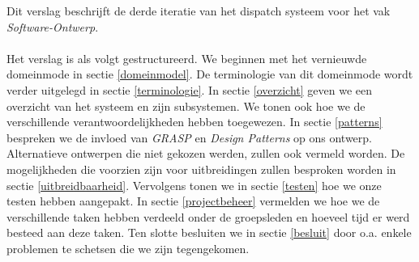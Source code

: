 Dit verslag beschrijft de derde iteratie van het dispatch systeem voor het vak \textit{Software-Ontwerp}.
\paragraph{}
Het verslag is als volgt gestructureerd. We beginnen met het vernieuwde domeinmode in sectie \ref{domeinmodel}. De terminologie van dit domeinmode wordt verder uitgelegd in sectie \ref{terminologie}. In sectie \ref{overzicht} geven we een overzicht van het systeem en zijn subsystemen.
We tonen ook hoe we de verschillende verantwoordelijkheden hebben toegewezen.
In sectie \ref{patterns} bespreken we de invloed van \textit{GRASP} en \textit{Design Patterns} op ons ontwerp.
Alternatieve ontwerpen die niet gekozen werden, zullen ook vermeld worden.
De mogelijkheden die voorzien zijn voor uitbreidingen zullen besproken worden in sectie \ref{uitbreidbaarheid}.
Vervolgens tonen we in sectie \ref{testen} hoe we onze testen hebben aangepakt.
In sectie \ref{projectbeheer} vermelden we hoe we de verschillende taken hebben verdeeld onder de groepsleden
en hoeveel tijd er werd besteed aan deze taken.
Ten slotte besluiten we in sectie \ref{besluit} door o.a. enkele problemen te schetsen die we zijn tegengekomen.
